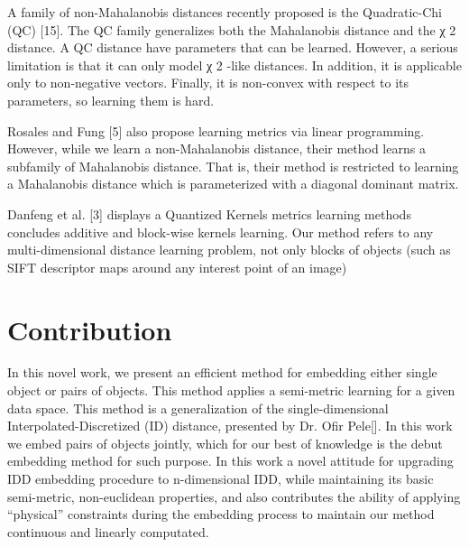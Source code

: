 A family of non-Mahalanobis distances recently proposed is the Quadratic-Chi (QC) [15]. The QC family generalizes both the Mahalanobis distance and the χ 2 distance. A QC distance have parameters that can be learned. However, a serious limitation is that it can only model χ 2 -like distances. In addition, it is applicable only to non-negative vectors. Finally, it is non-convex with respect to its parameters, so learning them is hard. 

Rosales and Fung [5] also propose learning metrics via linear programming. However, while we learn a non-Mahalanobis distance, their method learns a subfamily of Mahalanobis distance. That is, their method is restricted to learning a Mahalanobis distance which is parameterized with a diagonal dominant matrix. 

Danfeng et al. [3]  displays a Quantized Kernels metrics learning methods concludes additive and block-wise kernels learning. Our method refers to any multi-dimensional distance learning problem, not only blocks of objects (such as SIFT descriptor maps around any interest point of an image)


\section{Contribution}

In this novel work, we present an efficient method for embedding either single object or pairs of objects.
This method applies a semi-metric learning for a given data space. This method is a generalization of the single-dimensional Interpolated-Discretized (ID) distance, presented by Dr. Ofir Pele[]. 
In this work we embed pairs of objects jointly, which for our best of knowledge is the debut embedding method for such purpose.
In this work a novel attitude for upgrading IDD embedding procedure to n-dimensional IDD, while maintaining its basic semi-metric, non-euclidean properties, and also contributes the ability of applying “physical” constraints during the embedding process to maintain our method continuous and linearly computated. 

